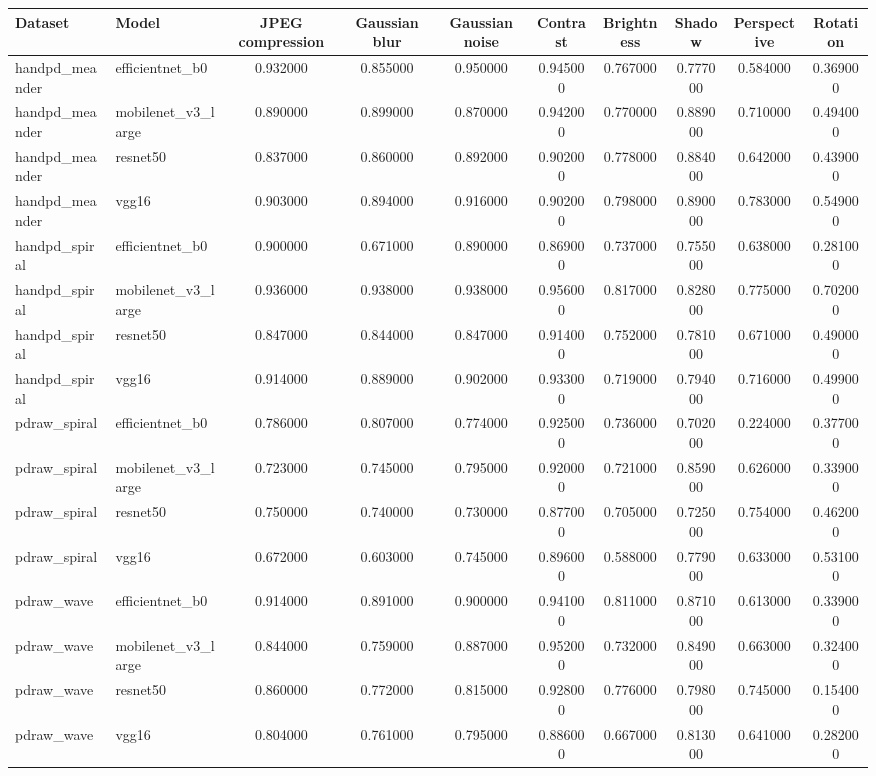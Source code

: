 \begin{tabular}{llcccccccc}
\toprule
Dataset & Model & JPEG compression & Gaussian blur & Gaussian noise & Contrast & Brightness & Shadow & Perspective & Rotation \\
\midrule
handpd_meander & efficientnet_b0 & 0.932000 & 0.855000 & 0.950000 & 0.945000 & 0.767000 & 0.777000 & 0.584000 & 0.369000 \\
handpd_meander & mobilenet_v3_large & 0.890000 & 0.899000 & 0.870000 & 0.942000 & 0.770000 & 0.889000 & 0.710000 & 0.494000 \\
handpd_meander & resnet50 & 0.837000 & 0.860000 & 0.892000 & 0.902000 & 0.778000 & 0.884000 & 0.642000 & 0.439000 \\
handpd_meander & vgg16 & 0.903000 & 0.894000 & 0.916000 & 0.902000 & 0.798000 & 0.890000 & 0.783000 & 0.549000 \\
handpd_spiral & efficientnet_b0 & 0.900000 & 0.671000 & 0.890000 & 0.869000 & 0.737000 & 0.755000 & 0.638000 & 0.281000 \\
handpd_spiral & mobilenet_v3_large & 0.936000 & 0.938000 & 0.938000 & 0.956000 & 0.817000 & 0.828000 & 0.775000 & 0.702000 \\
handpd_spiral & resnet50 & 0.847000 & 0.844000 & 0.847000 & 0.914000 & 0.752000 & 0.781000 & 0.671000 & 0.490000 \\
handpd_spiral & vgg16 & 0.914000 & 0.889000 & 0.902000 & 0.933000 & 0.719000 & 0.794000 & 0.716000 & 0.499000 \\
pdraw_spiral & efficientnet_b0 & 0.786000 & 0.807000 & 0.774000 & 0.925000 & 0.736000 & 0.702000 & 0.224000 & 0.377000 \\
pdraw_spiral & mobilenet_v3_large & 0.723000 & 0.745000 & 0.795000 & 0.920000 & 0.721000 & 0.859000 & 0.626000 & 0.339000 \\
pdraw_spiral & resnet50 & 0.750000 & 0.740000 & 0.730000 & 0.877000 & 0.705000 & 0.725000 & 0.754000 & 0.462000 \\
pdraw_spiral & vgg16 & 0.672000 & 0.603000 & 0.745000 & 0.896000 & 0.588000 & 0.779000 & 0.633000 & 0.531000 \\
pdraw_wave & efficientnet_b0 & 0.914000 & 0.891000 & 0.900000 & 0.941000 & 0.811000 & 0.871000 & 0.613000 & 0.339000 \\
pdraw_wave & mobilenet_v3_large & 0.844000 & 0.759000 & 0.887000 & 0.952000 & 0.732000 & 0.849000 & 0.663000 & 0.324000 \\
pdraw_wave & resnet50 & 0.860000 & 0.772000 & 0.815000 & 0.928000 & 0.776000 & 0.798000 & 0.745000 & 0.154000 \\
pdraw_wave & vgg16 & 0.804000 & 0.761000 & 0.795000 & 0.886000 & 0.667000 & 0.813000 & 0.641000 & 0.282000 \\
\bottomrule
\end{tabular}

